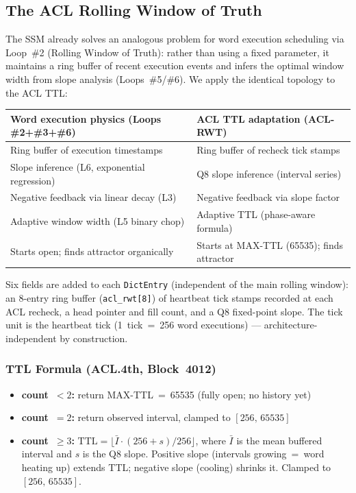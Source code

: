 \documentclass[10pt,a4paper]{article}
\begin{document}
\subsection{The ACL Rolling Window of Truth}
\label{sec:acl_rwt}

The SSM already solves an analogous problem for word execution scheduling via
Loop~\#2 (Rolling Window of Truth): rather than using a fixed parameter, it
maintains a ring buffer of recent execution events and infers the optimal
window width from slope analysis (Loops~\#5/\#6).  We apply the identical
topology to the ACL TTL:

\begin{center}
\renewcommand{\arraystretch}{1.2}
\begin{tabular}{p{5.5cm}p{5.5cm}}
\toprule
\textbf{Word execution physics (Loops \#2+\#3+\#6)} &
\textbf{ACL TTL adaptation (ACL-RWT)} \\
\midrule
Ring buffer of execution timestamps & Ring buffer of recheck tick stamps \\
Slope inference (L6, exponential regression) & Q8 slope inference (interval series) \\
Negative feedback via linear decay (L3) & Negative feedback via slope factor \\
Adaptive window width (L5 binary chop) & Adaptive TTL (phase-aware formula) \\
Starts open; finds attractor organically & Starts at MAX-TTL (65535); finds attractor \\
\bottomrule
\end{tabular}
\end{center}

\medskip
Six fields are added to each \texttt{DictEntry} (independent of the main
rolling window): an 8-entry ring buffer (\texttt{acl\_rwt[8]}) of heartbeat
tick stamps recorded at each ACL recheck, a head pointer and fill count, and
a Q8 fixed-point slope.  The tick unit is the heartbeat tick
(1~tick~=~256 word executions) --- architecture-independent by construction.

\subsubsection*{TTL Formula (ACL.4th, Block~4012)}

\begin{itemize}[noitemsep]
  \item \textbf{count~$< 2$:}   return MAX-TTL~=~65535 (fully open; no history yet)
  \item \textbf{count~$= 2$:}   return observed interval, clamped to $[256,\,65535]$
  \item \textbf{count~$\geq 3$:} $\text{TTL} = \lfloor\bar{I}\cdot(256+s)/256\rfloor$,
    where $\bar{I}$ is the mean buffered interval and $s$ is the Q8 slope.
    Positive slope (intervals growing~=~word heating up) extends TTL;
    negative slope (cooling) shrinks it.  Clamped to $[256,\,65535]$.
\end{itemize}
\end{document}
